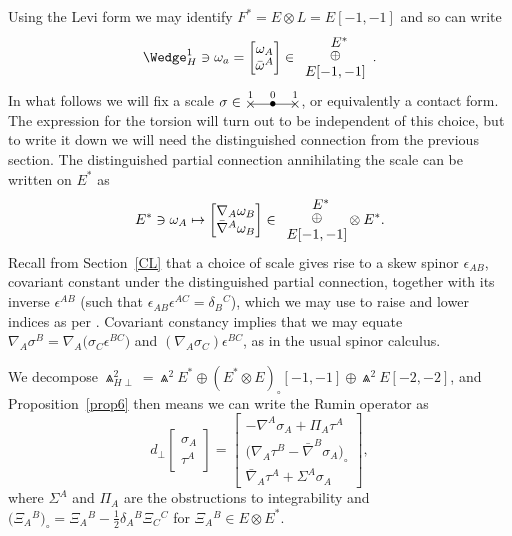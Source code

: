 \documentclass[10pt,a4paper]{amsart}
\numberwithin{equation}{section}
\newcommand{\xox}[3]{\begin{picture}(40,11)
\put(4,1.5){\makebox(0,0){$\times$}}
\put(20,1.5){\makebox(0,0){$\bullet$}}
\put(36,1.5){\makebox(0,0){$\times$}}
\put(4,1.5){\line(1,0){32}}
\put(4,8){\makebox(0,0){$\scriptstyle #1$}}
\put(20,8){\makebox(0,0){$\scriptstyle #2$}}
\put(36,8){\makebox(0,0){$\scriptstyle #3$}}
\end{picture}}
\begin{document}
Using the Levi form we may identify $F^* = E \otimes L = E[-1,-1]$ and so
can write
\[\Wedge_H^1 \ni \omega_a = \begin{bmatrix} \omega_A \\ \bar{\omega}^A
\end{bmatrix} \in \begin{array}{c}
\hspace{2mm}E^*\\[-3pt] \oplus\\ E[-1,-1]\end{array}. \]
In what follows we will fix a scale $\sigma \in \xox{1}{0}{1}$, or equivalently
a contact form. The expression for the torsion will turn out to be independent
of this choice, but to write it down we will need the distinguished connection
from the previous section. The distinguished partial connection annihilating
the scale can be written on $E^*$ as
\[E^* \ni \omega_A \mapsto \begin{bmatrix} \nabla_A\omega_B \\
\bar{\nabla}^A\omega_B \end{bmatrix} \in \begin{array}{c}
\hspace{2mm}E^*\\[-3pt] \oplus\\ E[-1,-1] \end{array}
\hspace{-2mm} \otimes E^*.
\]
Recall from Section~\ref{CL} that a choice of scale gives rise to a skew spinor
$\epsilon_{AB}$, covariant constant under the distinguished partial connection,
together with its inverse $\epsilon^{AB}$ (such that
$\epsilon_{AB}\epsilon^{AC}=\delta_B{}^C$), which we may use to raise and lower
indices as per \cite{OT}. Covariant constancy implies that we may equate
$\nabla_A \sigma^B = \nabla_A\big(\sigma_C\epsilon^{BC}\big)$ and
$(\nabla_A\sigma_C)\epsilon^{BC}$, as in the usual spinor calculus.

We decompose $\Wedge_{H\perp}^2
= \Wedge^2E^* \oplus (E^* \otimes E)_\circ[-1,-1] \oplus \Wedge^2E[-2,-2]$,
and Proposition~\ref{prop6} then means we can write the Rumin operator as
\[d_\perp
\begin{bmatrix}
\sigma_A \\
\tau^A
\end{bmatrix} = \begin{bmatrix}
 -\nabla^A\sigma_A + \Pi_A\tau^A \\
\big(\nabla_A\tau^B - \bar{\nabla}^B\sigma_A\big)_\circ \\
 \bar{\nabla}_A\tau^A + \Sigma^A\sigma_A
\end{bmatrix},
\]
where $\Sigma^A$ and $\Pi_A$ are the obstructions to integrability and
$\big(\Xi_A{}^B\big)_\circ = \Xi_A{}^B - \frac{1}{2}\delta_A{}^B\Xi_C{}^C$
for $\Xi_A{}^B \in E \otimes E^*$.
\end{document}
